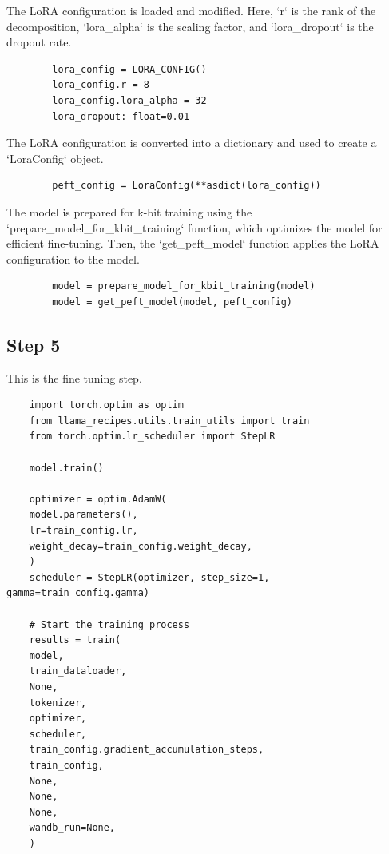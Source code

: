 \documentclass{solutionclass} %
\begin{document}
\begin{solution}
	The LoRA configuration is loaded and modified. Here, `r` is the rank of the decomposition, `lora\_alpha` is the scaling factor, and `lora\_dropout` is the dropout rate.
	\begin{lstlisting}
		lora_config = LORA_CONFIG()
		lora_config.r = 8
		lora_config.lora_alpha = 32
		lora_dropout: float=0.01
	\end{lstlisting}
\end{solution}

\begin{solution}
	The LoRA configuration is converted into a dictionary and used to create a `LoraConfig` object.
	\begin{lstlisting}
		peft_config = LoraConfig(**asdict(lora_config))
	\end{lstlisting}
\end{solution}

\begin{solution}
	The model is prepared for k-bit training using the `prepare\_model\_for\_kbit\_training` function, which optimizes the model for efficient fine-tuning. Then, the `get\_peft\_model` function applies the LoRA configuration to the model.
	\begin{lstlisting}
		model = prepare_model_for_kbit_training(model)
		model = get_peft_model(model, peft_config)
	\end{lstlisting}
\end{solution}


\subsection*{Step 5}

This is the fine tuning step.


\begin{lstlisting}
	import torch.optim as optim
	from llama_recipes.utils.train_utils import train
	from torch.optim.lr_scheduler import StepLR
	
	model.train()
	
	optimizer = optim.AdamW(
	model.parameters(),
	lr=train_config.lr,
	weight_decay=train_config.weight_decay,
	)
	scheduler = StepLR(optimizer, step_size=1, gamma=train_config.gamma)
	
	# Start the training process
	results = train(
	model,
	train_dataloader,
	None,
	tokenizer,
	optimizer,
	scheduler,
	train_config.gradient_accumulation_steps,
	train_config,
	None,
	None,
	None,
	wandb_run=None,
	)
\end{lstlisting}
\end{document}
